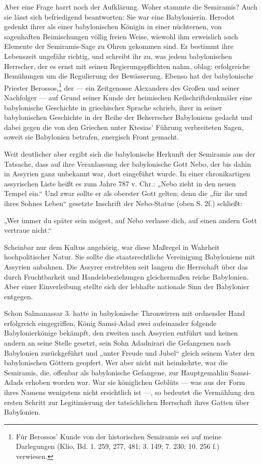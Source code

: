 \documentclass[a4paper, 11pt, oneside, polutonikogreek, german]{article}
\begin{document}
Aber eine Frage harrt noch der Aufklärung. Woher stammte die Semiramis? Auch sie lässt sich befriedigend beantworten: Sie war eine Babylonierin. Herodot gedenkt ihrer als einer babylonischen Königin in einer nüchternen, von sagenhaften Beimischungen völlig freien Weise, wiewohl ihm erweislich auch Elemente der Semiramis-Sage zu Ohren gekommen sind. Er bestimmt ihre Lebenszeit ungefähr richtig, und schreibt ihr zu, was jedem babylonischen Herrscher, der es ernst mit seinen Regierungspflichten nahm, oblag: erfolgreiche Bemühungen um die Regulierung der Bewässerung. Ebenso hat der babylonische Priester Berossos,\footnote{Für Berossos' Kunde von der historischen Semiramis sei auf meine Darlegungen (Klio, Bd. 1. 259, 277, 481; 3. 149; 7. 230; 10. 256 f.) verwiesen.} der --- ein Zeitgenosse Alexanders des Großen und seiner Nachfolger --- auf Grund seiner Kunde der heimischen Keilschriftdenkmäler eine babylonische Geschichte in griechischer Sprache schrieb, ihrer in seiner babylonischen Geschichte in der Reihe der Beherrscher Babyloniens gedacht und dabei gegen die von den Griechen unter Ktesias' Führung verbreiteten Sagen, soweit sie Babylonien betrafen, energisch Front gemacht.

Weit deutlicher aber ergibt sich die babylonische Herkunft der Semiramis aus der Tatsache, dass auf ihre Veranlassung der babylonische Gott Nebo, der bis dahin in Assyrien ganz unbekannt war, dort eingeführt wurde. In einer chronikartigen assyrischen Liste heißt es zum Jahre 787 v. Chr.: „Nebo zieht in den neuen Tempel ein.“ Und zwar sollte er als oberster Gott gelten; denn die „für ihr und ihres Sohnes Leben“ gesetzte Inschrift der Nebo-Statue (oben S. 2f.) schließt:

„Wer immer du später sein mögest, auf Nebo verlasse dich, auf einen andern Gott vertraue nicht.“

Scheinbar nur dem Kultus angehörig, war diese Maßregel in Wahrheit hochpolitischer Natur. Sie sollte die staatsrechtliche Vereinigung Babyloniens mit Assyrien anbahnen. Die Assyrer erstrebten seit langem die Herrschaft über das durch Fruchtbarkeit und Handelsbeziehungen gleichermaßen reiche Babylonien. Aber einer Einverleibung stellte sich der lebhafte nationale Sinn der Babylonier entgegen.

Schon Salmanassar 3. hatte in babylonische Thronwirren mit ordnender Hand erfolgreich eingegriffen, König Samsi-Adad zwei aufeinander folgende Babylonierkönige bekämpft, den zweiten nach Assyrien entführt und keinen andern an seine Stelle gesetzt, sein Sohn Adadnirari die Gefangenen nach Babylonien zurückgeführt und „unter Freude und Jubel“ gleich seinem Vater den babylonischen Göttern geopfert. Wer aber nicht mit heimkehrte, war die Semiramis, die, offenbar als babylonische Gefangene, zur Hauptgemahlin Samsi-Adads erhoben worden war. War sie königlichen Geblüts --- was aus der Form ihres Namens wenigstens nicht ersichtlich ist ---, so bedeutet die Vermählung den ersten Schritt zur Legitimierung der tatsächlichen Herrschaft ihres Gatten über Babylonien.
\end{document}
